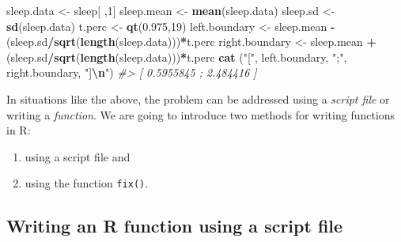 \documentclass[
]{book}
\newenvironment{Shaded}{\begin{snugshade}}{\end{snugshade}}
\newcommand{\CommentTok}[1]{\textcolor[rgb]{0.56,0.35,0.01}{\textit{#1}}}
\newcommand{\DecValTok}[1]{\textcolor[rgb]{0.00,0.00,0.81}{#1}}
\newcommand{\FloatTok}[1]{\textcolor[rgb]{0.00,0.00,0.81}{#1}}
\newcommand{\FunctionTok}[1]{\textcolor[rgb]{0.13,0.29,0.53}{\textbf{#1}}}
\newcommand{\NormalTok}[1]{#1}
\newcommand{\OtherTok}[1]{\textcolor[rgb]{0.56,0.35,0.01}{#1}}
\newcommand{\SpecialCharTok}[1]{\textcolor[rgb]{0.81,0.36,0.00}{\textbf{#1}}}
\newcommand{\StringTok}[1]{\textcolor[rgb]{0.31,0.60,0.02}{#1}}
\providecommand{\tightlist}{%
  \setlength{\itemsep}{0pt}\setlength{\parskip}{0pt}}
\begin{document}
\begin{Shaded}
\begin{Highlighting}[]
\NormalTok{sleep.data }\OtherTok{\textless{}{-}}\NormalTok{ sleep[ ,}\DecValTok{1}\NormalTok{]   }
\NormalTok{sleep.mean }\OtherTok{\textless{}{-}} \FunctionTok{mean}\NormalTok{(sleep.data)   }
\NormalTok{sleep.sd }\OtherTok{\textless{}{-}} \FunctionTok{sd}\NormalTok{(sleep.data)    }
\NormalTok{t.perc }\OtherTok{\textless{}{-}} \FunctionTok{qt}\NormalTok{(}\FloatTok{0.975}\NormalTok{,}\DecValTok{19}\NormalTok{) }
\NormalTok{left.boundary }\OtherTok{\textless{}{-}}\NormalTok{ sleep.mean }\SpecialCharTok{{-}}\NormalTok{ (sleep.sd}\SpecialCharTok{/}\FunctionTok{sqrt}\NormalTok{(}\FunctionTok{length}\NormalTok{(sleep.data)))}\SpecialCharTok{*}\NormalTok{t.perc }
\NormalTok{right.boundary }\OtherTok{\textless{}{-}}\NormalTok{ sleep.mean }\SpecialCharTok{+}\NormalTok{ (sleep.sd}\SpecialCharTok{/}\FunctionTok{sqrt}\NormalTok{(}\FunctionTok{length}\NormalTok{(sleep.data)))}\SpecialCharTok{*}\NormalTok{t.perc}
\FunctionTok{cat}\NormalTok{ (}\StringTok{"["}\NormalTok{, left.boundary, }\StringTok{";"}\NormalTok{, right.boundary, }\StringTok{"]}\SpecialCharTok{\textbackslash{}n}\StringTok{"}\NormalTok{)}
\CommentTok{\#\textgreater{} [ 0.5955845 ; 2.484416 ]}
\end{Highlighting}
\end{Shaded}

In situations like the above, the problem can be addressed using a \emph{{script file}} or writing a \emph{{function}}. We are going to introduce two methods for writing functions in R:

\begin{enumerate}
\def\labelenumi{(\roman{enumi})}
\tightlist
\item
  using a script file and
\item
  using the function \texttt{fix()}.
\end{enumerate}

\subsection{Writing an R function using a script file}\label{script}
\end{document}
